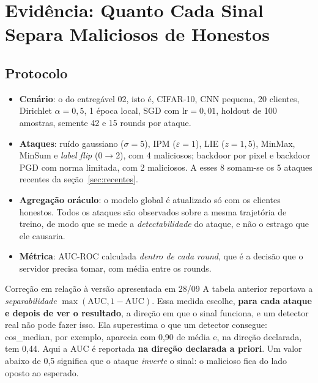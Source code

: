 \documentclass[11pt,a4paper]{article}
\begin{document}
\section{Evidência: Quanto Cada Sinal Separa Maliciosos de Honestos}
\label{sec:evidencia}

\subsection{Protocolo}
\begin{itemize}
  \item \textbf{Cenário}: o do entregável 02, isto é, CIFAR-10, CNN pequena, 20 clientes, Dirichlet
        $\alpha = 0{,}5$, 1 época local, SGD com $\text{lr} = 0{,}01$, holdout de 100 amostras, semente 42
        e 15 rounds por ataque.
  \item \textbf{Ataques}: ruído gaussiano ($\sigma = 5$), IPM ($\varepsilon = 1$), LIE ($z = 1{,}5$),
        MinMax, MinSum e \emph{label flip} (0$\to$2), com 4 maliciosos; backdoor por pixel e backdoor PGD
        com norma limitada, com 2 maliciosos. A esses 8 somam-se os 5 ataques recentes da
        seção~\ref{sec:recentes}.
  \item \textbf{Agregação oráculo}: o modelo global é atualizado só com os clientes honestos. Todos os
        ataques são observados sobre a mesma trajetória de treino, de modo que se mede a
        \emph{detectabilidade} do ataque, e não o estrago que ele causaria.
  \item \textbf{Métrica}: AUC-ROC calculada \emph{dentro de cada round}, que é a decisão que o servidor
        precisa tomar, com média entre os rounds.
\end{itemize}

\begin{alertbox}{Correção em relação à versão apresentada em 28/09}
A tabela anterior reportava a \emph{separabilidade} $\max(\text{AUC}, 1-\text{AUC})$. Essa medida escolhe,
\textbf{para cada ataque e depois de ver o resultado}, a direção em que o sinal funciona, e um detector
real não pode fazer isso. Ela superestima o que um detector consegue: cos\_median, por exemplo, aparecia
com 0,90 de média e, na direção declarada, tem 0,44. Aqui a AUC é reportada \textbf{na direção
declarada a priori}. Um valor abaixo de 0,5 significa que o ataque \emph{inverte} o sinal: o malicioso
fica do lado oposto ao esperado.
\end{alertbox}
\end{document}
